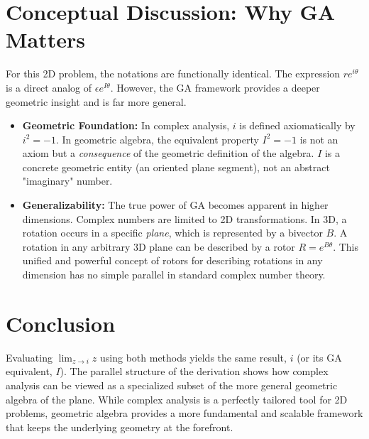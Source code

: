 \documentclass[11pt, a4paper]{article}
\begin{document}
\bigskip

\section{Conceptual Discussion: Why GA Matters}
For this 2D problem, the notations are functionally identical. The expression $re^{i\theta}$ is a direct analog of $\epsilon e^{I\theta}$. However, the GA framework provides a deeper geometric insight and is far more general.

\begin{itemize}
    \item \textbf{Geometric Foundation:} In complex analysis, $i$ is defined axiomatically by $i^2 = -1$. In geometric algebra, the equivalent property $I^2 = -1$ is not an axiom but a \textit{consequence} of the geometric definition of the algebra. $I$ is a concrete geometric entity (an oriented plane segment), not an abstract "imaginary" number.

    \item \textbf{Generalizability:} The true power of GA becomes apparent in higher dimensions. Complex numbers are limited to 2D transformations. In 3D, a rotation occurs in a specific \textit{plane}, which is represented by a bivector $B$. A rotation in any arbitrary 3D plane can be described by a rotor $R = e^{B\theta}$. This unified and powerful concept of rotors for describing rotations in any dimension has no simple parallel in standard complex number theory.
\end{itemize}

\section{Conclusion}
Evaluating $\lim_{z \to i} z$ using both methods yields the same result, $i$ (or its GA equivalent, $I$). The parallel structure of the derivation shows how complex analysis can be viewed as a specialized subset of the more general geometric algebra of the plane. While complex analysis is a perfectly tailored tool for 2D problems, geometric algebra provides a more fundamental and scalable framework that keeps the underlying geometry at the forefront.
\end{document}
